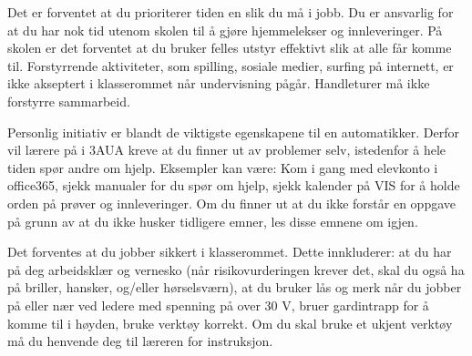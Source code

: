 \documentclass[12pt,a4paper]{book}
\begin{document}
\vskip 10pt

%
%
%
%
%

\noindent
{} Det er forventet at du prioriterer tiden en slik du må i jobb. Du er ansvarlig for at du har nok tid utenom skolen til å gjøre hjemmelekser og innleveringer. På skolen er det forventet at du bruker felles utstyr effektivt slik at alle får komme til. Forstyrrende aktiviteter, som spilling, sosiale medier, surfing på internett, er ikke akseptert i klasserommet når undervisning pågår. Handleturer må ikke forstyrre sammarbeid. 


\vskip 10pt



\noindent
{} Personlig initiativ er blandt de viktigste egenskapene til en automatikker. Derfor vil lærere på i 3AUA kreve at du finner ut av problemer selv, istedenfor å hele tiden spør andre om hjelp. Eksempler kan være: Kom i gang med elevkonto i office365, sjekk manualer for du spør om hjelp, sjekk kalender på VIS for å holde orden på prøver og innleveringer. Om du finner ut at du ikke forstår en oppgave på grunn av at du ikke husker tidligere emner, les disse emnene om igjen. 
\vskip 10pt

\noindent
{} Det forventes at du jobber sikkert i klasserommet. Dette innkluderer: at du har på deg arbeidsklær og vernesko (når risikovurderingen krever det,  skal du også ha på briller, hansker, og/eller hørselsværn), at du bruker lås og merk når du jobber på eller nær ved ledere med spenning på over 30 V, bruer gardintrapp for å komme til i høyden, bruke verktøy korrekt. Om du skal bruke et ukjent verktøy må du henvende deg til læreren for instruksjon. 
\vskip 10pt
\end{document}
